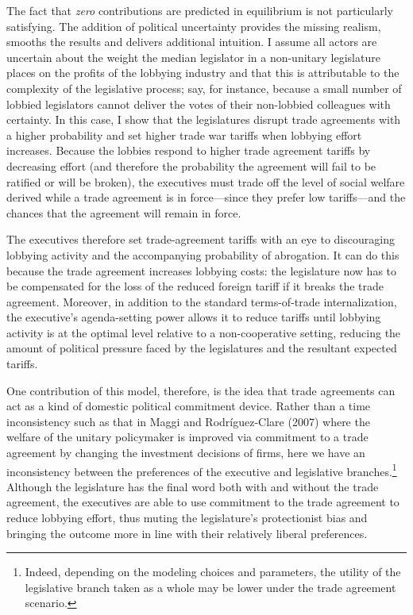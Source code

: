 \documentclass[10pt]{article}
\begin{document}
The fact that \textit{zero} contributions are predicted in equilibrium is not particularly satisfying. The addition of political uncertainty provides the missing realism, smooths the results and delivers additional intuition. I assume all actors are uncertain about the weight the median legislator in a non-unitary legislature places on the profits of the lobbying industry and that this is attributable to the complexity of the legislative process; say, for instance, because a small number of lobbied legislators cannot deliver the votes of their non-lobbied colleagues with certainty. In this case, I show that the legislatures disrupt trade agreements with a higher probability and set higher trade war tariffs when lobbying effort increases. Because the lobbies respond to higher trade agreement tariffs by decreasing effort (and therefore the probability the agreement will fail to be ratified or will be broken), the executives must trade off the level of social welfare derived while a trade agreement is in force---since they prefer low tariffs---and the chances that the agreement will remain in force.

The executives therefore set trade-agreement tariffs with an eye to discouraging lobbying activity and the accompanying probability of abrogation. It can do this because the trade agreement increases lobbying costs: the legislature now has to be compensated for the loss of the reduced foreign tariff if it breaks the trade agreement. Moreover, in addition to the standard terms-of-trade internalization, the executive's agenda-setting power allows it to reduce tariffs until lobbying activity is at the optimal level relative to a non-cooperative setting, reducing the amount of political pressure faced by the legislatures and the resultant expected tariffs.

One contribution of this model, therefore, is the idea that trade agreements can act as a kind of domestic political commitment device. Rather than a time inconsistency such as that in Maggi and Rodr\'{i}guez-Clare (2007) where the welfare of the unitary policymaker is improved via commitment to a trade agreement by changing the investment decisions of firms, here we have an inconsistency between the preferences of the executive and legislative branches.\footnote{Indeed, depending on the modeling choices and parameters, the utility of the legislative branch taken as a whole may be lower under the trade agreement scenario.} Although the legislature has the final word both with and without the trade agreement, the executives are able to use commitment to the trade agreement to reduce lobbying effort, thus muting the legislature's protectionist bias and bringing the outcome more in line with their relatively liberal preferences.
\end{document}
